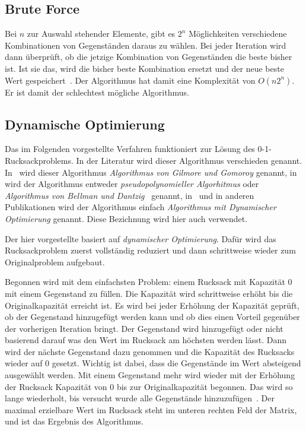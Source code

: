 \documentclass[12pt, a4paper, ngerman]{article}
\begin{document}
\subsection{Brute Force}

Bei \(n\) zur Auswahl stehender Elemente, gibt es \(2^n\) Möglichkeiten verschiedene Kombinationen von Gegenständen daraus zu wählen.
Bei jeder Iteration wird dann überprüft,
ob die jetzige Kombination von Gegenständen die beste bisher ist.
Ist sie das, wird die bisher beste Kombination ersetzt und der neue beste Wert gespeichert~\cite{paper102}.
Der Algorithmus hat damit eine Komplexität von \(O(n2^n)\).
Er ist damit der schlechtest mögliche Algorithmus.

\subsection{Dynamische Optimierung}
\label{sec:dyn_opt}

Das im Folgenden vorgestellte Verfahren funktioniert zur Lösung des 0-1-Rucksackproblems.
In der Literatur wird dieser Algorithmus verschieden genannt.
In~\cite{scheiterhauer2008} wird dieser Algorithmus \emph{Algorithmus von Gilmore und Gomoroy} genannt,
in~\cite{KombinatorischeOptimierung} wird der Algorithmus entweder \emph{pseudopolynomieller Algorhitmus} oder
\emph{Algorithmus von Bellman und Dantzig}~\cite{KombinatorischeOptimierung} genannt,
in~\cite{paper102,intro_survey} und in anderen Publikationen wird der Algorithmus einfach
\emph{Algorithmus mit Dynamischer Optimierung} genannt.
Diese Bezichnung wird hier auch verwendet.

Der hier vorgestellte basiert auf \emph{dynamischer Optimierung}.
Dafür wird das Rucksackproblem zuerst vollständig reduziert
und dann schrittweise wieder zum Originalproblem aufgebaut.

Begonnen wird mit dem einfachsten Problem: einem Rucksack mit Kapazität 0 mit einem Gegenstand zu füllen.
Die Kapazität wird schrittweise erhöht bis die Originalkapazität erreicht ist.
Es wird bei jeder Erhöhung der Kapazität geprüft, ob der Gegenstand hinzugefügt werden kann
und ob dies einen Vorteil gegenüber der vorherigen Iteration bringt.
Der Gegenstand wird hinzugefügt oder nicht basierend darauf was den Wert im Rucksack am höchsten werden lässt.
Dann wird der nächste Gegenstand dazu genommen und die Kapazität des Rucksacks wieder auf 0 gesetzt.
Wichtig ist dabei, dass die Gegenstände im Wert absteigend ausgewählt werden.
Mit einem Gegenstand mehr wird wieder mit der Erhöhung der Rucksack Kapazität von 0 bis zur Originalkapazität begonnen.
Das wird so lange wiederholt, bis versucht wurde alle Gegenstände hinzuzufügen~\cite{scheiterhauer2008}.
Der maximal erzielbare Wert im Rucksack steht im unteren rechten Feld der Matrix,
und ist das Ergebnis des Algorithmus.
\end{document}

